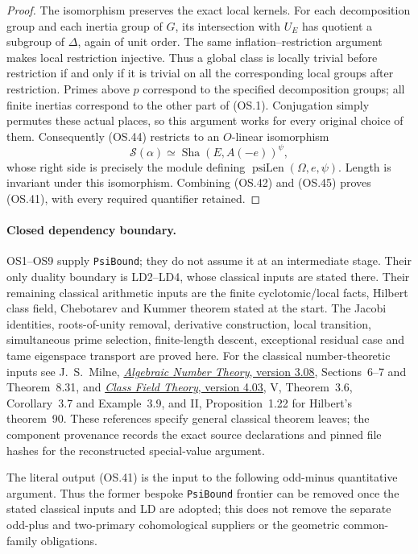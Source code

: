 \begin{proof}
The isomorphism preserves the exact local kernels.
For each decomposition group and each inertia group of $G$,
its intersection with $U_E$ has quotient a subgroup of $\Delta$,
again of unit order.  The same inflation--restriction argument
makes local restriction injective.  Thus a global class is locally
trivial before restriction if and only if it is trivial on all the
corresponding local groups after restriction.
Primes above $p$ correspond to the specified decomposition groups;
all finite inertias correspond to the other part of (OS.1).
Conjugation simply permutes these actual places, so this argument
works for every original choice of them.
Consequently (OS.44) restricts to an $O$-linear isomorphism
\[
 \mathscr S(\alpha)\simeq
 \operatorname{Sha}(E,A(-e))^{\psi},
 \tag{OS.45}
\]
whose right side is precisely the module defining
$\operatorname{psiLen}(\Omega,e,\psi)$.
Length is invariant under this isomorphism.  Combining (OS.42)
and (OS.45) proves (OS.41), with every required quantifier retained.
\end{proof}

\paragraph{Closed dependency boundary.}
OS1--OS9 supply \texttt{PsiBound}; they do not assume it at an
intermediate stage.  Their only duality boundary is LD2--LD4,
whose classical inputs are stated there.  Their remaining classical
arithmetic inputs are the finite cyclotomic/local facts, Hilbert
class field, Chebotarev and Kummer theorem stated at the start.
The Jacobi identities, roots-of-unity removal, derivative construction,
local transition, simultaneous prime selection, finite-length descent,
exceptional residual case and tame eigenspace transport are proved
here.  For the classical number-theoretic inputs see J.~S.~Milne,
\href{https://www.jmilne.org/math/CourseNotes/ANT.pdf}{\emph{Algebraic
Number Theory}, version 3.08}, Sections~6--7 and Theorem~8.31,
and
\href{https://www.jmilne.org/math/CourseNotes/CFT.pdf}{\emph{Class
Field Theory}, version 4.03}, V, Theorem~3.6, Corollary~3.7 and
Example~3.9, and II, Proposition~1.22 for Hilbert's theorem~90.
These references specify general classical theorem leaves; the
component provenance records the exact source declarations and pinned
file hashes for the reconstructed special-value argument.

The literal output (OS.41) is the input to the following odd-minus
quantitative argument.  Thus the former bespoke \texttt{PsiBound}
frontier can be removed once the stated classical inputs and LD are
adopted; this does not remove the separate odd-plus and two-primary
cohomological suppliers or the geometric common-family obligations.
